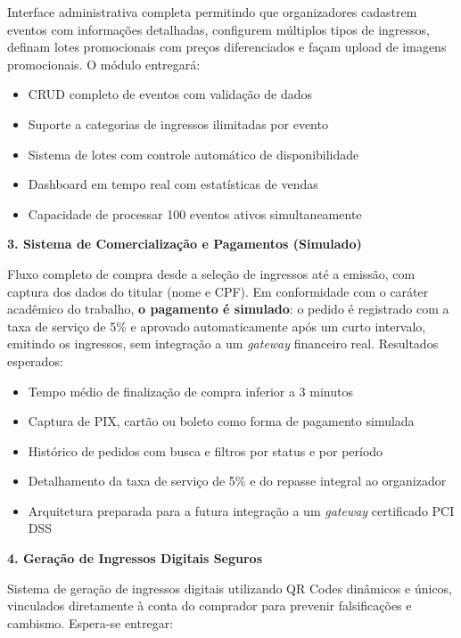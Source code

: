 Interface administrativa completa permitindo que organizadores cadastrem eventos com informações detalhadas, configurem múltiplos tipos de ingressos, definam lotes promocionais com preços diferenciados e façam upload de imagens promocionais. O módulo entregará:

\begin{itemize}
    \item CRUD completo de eventos com validação de dados
    \item Suporte a categorias de ingressos ilimitadas por evento
    \item Sistema de lotes com controle automático de disponibilidade
    \item Dashboard em tempo real com estatísticas de vendas
    \item Capacidade de processar 100 eventos ativos simultaneamente
\end{itemize}

\textbf{3. Sistema de Comercialização e Pagamentos (Simulado)}

Fluxo completo de compra desde a seleção de ingressos até a emissão, com captura dos dados do titular (nome e CPF). Em conformidade com o caráter acadêmico do trabalho, \textbf{o pagamento é simulado}: o pedido é registrado com a taxa de serviço de 5\% e aprovado automaticamente após um curto intervalo, emitindo os ingressos, sem integração a um \textit{gateway} financeiro real. Resultados esperados:

\begin{itemize}
    \item Tempo médio de finalização de compra inferior a 3 minutos
    \item Captura de PIX, cartão ou boleto como forma de pagamento simulada
    \item Histórico de pedidos com busca e filtros por status e por período
    \item Detalhamento da taxa de serviço de 5\% e do repasse integral ao organizador
    \item Arquitetura preparada para a futura integração a um \textit{gateway} certificado PCI DSS
\end{itemize}

\textbf{4. Geração de Ingressos Digitais Seguros}

Sistema de geração de ingressos digitais utilizando QR Codes dinâmicos e únicos, vinculados diretamente à conta do comprador para prevenir falsificações e cambismo. Espera-se entregar:

